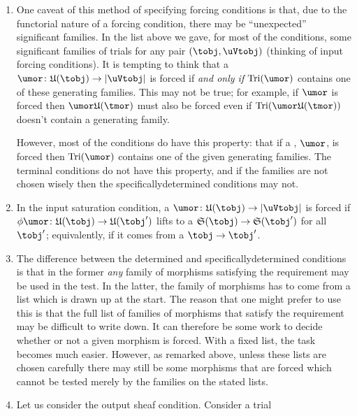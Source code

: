\documentclass[%
12pt,%
arxiv,%
defaults
]{myclass}
\begin{document}
\begin{remark}
\begin{enumerate}
\item 
One caveat of this method of specifying forcing conditions is that, due to the functorial nature of a forcing condition, there may be ``unexpected'' significant families.
In the list above we gave, for most of the conditions, some significant families of trials for any pair \((\tobj, \uVtobj)\) (thinking of input forcing conditions).
It is tempting to think that a \umor \(\umor \colon \ufunc(\tobj) \to \forfunc[\uVtobj]\) is forced if \emph{and only if} \(\trials{\umor}\) contains one of these generating families.
This may not be true; for example, if \(\umor\) is forced then \(\umor \ufunc(\tmor)\) must also be forced even if \(\trials{\umor \ufunc(\tmor)}\) doesn't contain a generating family.

However, most of the conditions do have this property: that if a \umor, \(\umor\), is forced then \(\trials{\umor}\) contains one of the given generating families.
The terminal conditions do not have this property, and if the families are not chosen wisely then the specifically\enhyp{}determined conditions may not.

\item 
In the input saturation condition, a \umor \(\umor \colon \ufunc(\tobj) \to \forfunc[\uVtobj]\) is forced if \(\ofn \umor \colon \ufunc(\tobj) \to \ufunc(\tobj')\) lifts to a \uVtmor \(\sfunc(\tobj) \to \sfunc(\tobj')\) for all \(\tobj'\); equivalently, if it comes from a \tmor \(\tobj \to \tobj'\).

\item
The difference between the determined and specifically\enhyp{}determined conditions is that in the former \emph{any} family of morphisms satisfying the requirement may be used in the test.
In the latter, the family of morphisms has to come from a list which is drawn up at the start.
The reason that one might prefer to use this is that the full list of families of morphisms that satisfy the requirement may be difficult to write down.
It can therefore be some work to decide whether or not a given morphism is forced.
With a fixed list, the task becomes much easier.
However, as remarked above, unless these lists are chosen carefully there may still be some morphisms that are forced which cannot be tested merely by the families on the stated lists.

\item Let us consider the output sheaf condition.
Consider a trial


\end{enumerate}
\end{remark}
\end{document}
